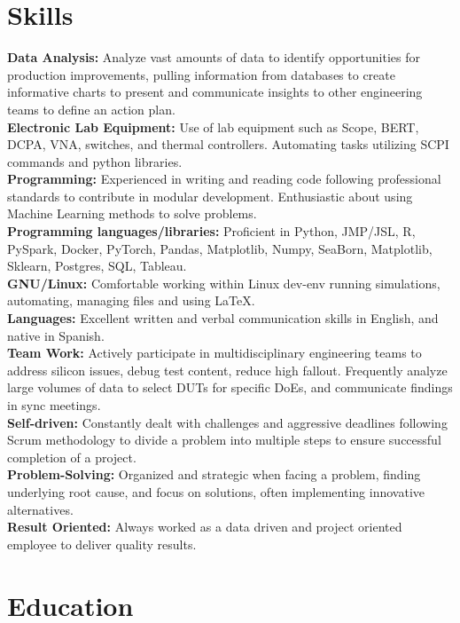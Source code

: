 \documentclass{article}
\begin{document}
\section{Skills}
\noindent\textbf{Data Analysis:} Analyze vast amounts of data to identify opportunities for production improvements, pulling information from databases to create informative charts to present and communicate insights to other engineering teams to define an action plan.\\
\textbf{Electronic Lab Equipment:} Use of lab equipment such as Scope, BERT, DCPA, VNA, switches, and thermal controllers. Automating tasks utilizing SCPI commands and python libraries.\\
\textbf{Programming:} Experienced in writing and reading code following professional standards to contribute in modular development. Enthusiastic about using Machine Learning methods to solve problems.\\
\textbf{Programming languages/libraries:} Proficient in Python, JMP/JSL, R, PySpark, Docker, PyTorch, Pandas, Matplotlib, Numpy, SeaBorn, Matplotlib, Sklearn, Postgres, SQL, Tableau.\\
\textbf{GNU/Linux:} Comfortable working within Linux dev-env running simulations, automating, managing files and using \LaTeX .\\
\textbf{Languages:} Excellent written and verbal communication skills in English, and native in Spanish.\\
\textbf{Team Work:} Actively participate in multidisciplinary engineering teams to address silicon issues, debug test content, reduce high fallout. Frequently analyze large volumes of data to select DUTs for specific DoEs, and communicate findings in sync meetings.\\
\textbf{Self-driven:} Constantly dealt with challenges and aggressive deadlines following Scrum methodology to divide a problem into multiple steps to ensure successful completion of a project.\\
\textbf{Problem-Solving:} Organized and strategic when facing a problem, finding underlying root cause, and focus on solutions, often implementing innovative alternatives. \\
\textbf{Result Oriented:} Always worked as a data driven and project oriented employee to deliver quality results. 

\section{Education}
\end{document}
